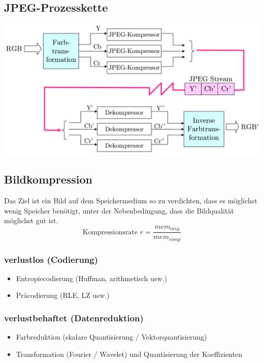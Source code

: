 \documentclass[10pt]{article}
\begin{document}
\subsection{JPEG-Prozesskette}
\begin{center}
	\includegraphics[scale=0.2]{jpeg.png}
\end{center}

\subsection{Bildkompression}
Das Ziel ist ein Bild auf dem Speichermedium so zu verdichten, dass es möglichst wenig Speicher benötigt, unter der Nebenbedingung, dass die Bildqualität möglichst gut ist. \\
\begin{equation*}
	\text{Kompressionsrate } r = \frac{mem_{orig}}{mem_{comp}}
\end{equation*}
\subsubsection*{verlustlos (Codierung)}
\begin{itemize}
	\item Entropiecodierung (Huffman, arithmetisch usw.)
	\item Präcodierung (RLE, LZ usw.)
\end{itemize}
\subsubsection*{verlustbehaftet (Datenreduktion)}
\begin{itemize}
	\item Farbreduktion (skalare Quantisierung / Vektorquantisierung)
	\item Transformation (Fourier / Wavelet) und Quantisierung der Koeffizienten
\end{itemize}
\end{document}
